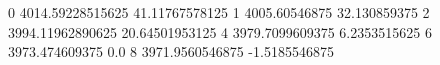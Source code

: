 0 4014.59228515625 41.11767578125
1 4005.60546875 32.130859375
2 3994.11962890625 20.64501953125
4 3979.7099609375 6.2353515625
6 3973.474609375 0.0
8 3971.9560546875 -1.5185546875
